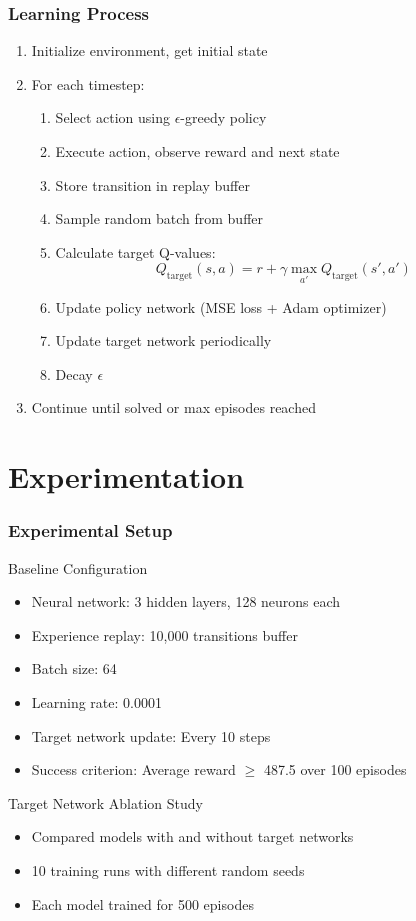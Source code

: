 \documentclass[
    9pt,
    aspectratio=169,
]{beamer}
\begin{document}
\begin{frame}
\frametitle{Learning Process}
\begin{enumerate}
    \item Initialize environment, get initial state
    \item For each timestep:
    \begin{enumerate}
        \item Select action using $\epsilon$-greedy policy
        \item Execute action, observe reward and next state
        \item Store transition in replay buffer
        \item Sample random batch from buffer
        \item Calculate target Q-values:
        \begin{equation}
            Q_{\text{target}}(s,a) = r + \gamma \max_{a'} Q_{\text{target}}(s',a')
        \end{equation}
        \item Update policy network (MSE loss + Adam optimizer)
        \item Update target network periodically
        \item Decay $\epsilon$
    \end{enumerate}
    \item Continue until solved or max episodes reached
\end{enumerate}
\end{frame}

\section{Experimentation}

\begin{frame}
\frametitle{Experimental Setup}
\begin{block}{Baseline Configuration}
    \begin{itemize}
        \item Neural network: 3 hidden layers, 128 neurons each
        \item Experience replay: 10,000 transitions buffer
        \item Batch size: 64
        \item Learning rate: 0.0001
        \item Target network update: Every 10 steps
        \item Success criterion: Average reward $\geq$ 487.5 over 100 episodes
    \end{itemize}
\end{block}

\begin{block}{Target Network Ablation Study}
    \begin{itemize}
        \item Compared models with and without target networks
        \item 10 training runs with different random seeds
        \item Each model trained for 500 episodes
    \end{itemize}
\end{block}
\end{frame}
\end{document}
